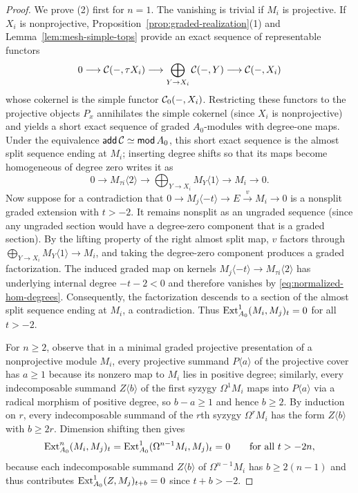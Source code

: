 \begin{proof}
We prove (2) first for $n=1$. The vanishing is trivial if $M_i$ is
projective. If $X_i$ is nonprojective, Proposition~\ref{prop:graded-realization}(1)
and Lemma~\ref{lem:mesh-simple-tops} provide an exact sequence of
representable functors
\[
 0\longrightarrow\mathcal C(-,\tau X_i)\longrightarrow
 \bigoplus_{Y\to X_i}\mathcal C(-,Y)\longrightarrow\mathcal C(-,X_i)
\]
whose cokernel is the simple functor $\mathcal C_0(-,X_i)$. Restricting these
functors to the projective objects $P_x$ annihilates the simple cokernel
(since $X_i$ is nonprojective) and yields a short exact sequence of graded
$A_0$-modules with degree-one maps. Under the equivalence
$\operatorname{\mathsf{add}}\mathcal C\simeq\operatorname{\mathsf{mod}} A_0$, this short exact sequence is the almost split
sequence ending at $M_i$; inserting degree shifts so that its maps become
homogeneous of degree zero writes it as
\[
 0\longrightarrow M_{\tau i}\langle2\rangle\longrightarrow
 \bigoplus_{Y\to X_i}M_Y\langle1\rangle\longrightarrow M_i
 \longrightarrow0.
\]
Now suppose for a contradiction that
$0\to M_j\langle-t\rangle\to E\xrightarrow{v}M_i\to0$ is a nonsplit graded
extension with $t>-2$. It remains nonsplit as an ungraded sequence (since any
ungraded section would have a degree-zero component that is a graded
section). By the lifting property of the right almost split map, $v$ factors
through $\bigoplus_{Y\to X_i}M_Y\langle1\rangle\to M_i$, and taking the
degree-zero component produces a graded factorization. The induced graded
map on kernels $M_j\langle-t\rangle\to M_{\tau i}\langle2\rangle$ has
underlying internal degree $-t-2<0$ and therefore vanishes by
\eqref{eq:normalized-hom-degrees}. Consequently, the factorization descends
to a section of the almost split sequence ending at $M_i$, a contradiction.
Thus $\operatorname{Ext}^1_{A_0}(M_i,M_j)_t=0$ for all $t>-2$.

For $n\geq2$, observe that in a minimal graded projective presentation of a
nonprojective module $M_i$, every projective summand $P\langle a\rangle$ of
the projective cover has $a\geq1$ because its nonzero map to $M_i$ lies in
positive degree; similarly, every indecomposable summand $Z\langle b\rangle$
of the first syzygy $\Omega^1 M_i$ maps into $P\langle a\rangle$ via a
radical morphism of positive degree, so $b-a\geq1$ and hence $b\geq2$. By
induction on $r$, every indecomposable summand of the $r$th syzygy
$\Omega^r M_i$ has the form $Z\langle b\rangle$ with $b\geq 2r$. Dimension
shifting then gives
\[
 \operatorname{Ext}^n_{A_0}(M_i,M_j)_t
 =\operatorname{Ext}^1_{A_0}(\Omega^{n-1}M_i,M_j)_t=0
 \qquad\text{for all }t>-2n,
\]
because each indecomposable summand $Z\langle b\rangle$ of
$\Omega^{n-1}M_i$ has $b\geq 2(n-1)$ and thus contributes
$\operatorname{Ext}^1_{A_0}(Z,M_j)_{t+b}=0$ since $t+b>-2$.
\end{proof}

